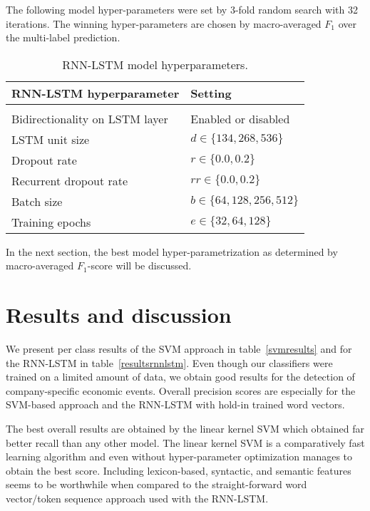 \documentclass[11pt,a4paper]{article}
\begin{document}
The following model hyper-parameters were set by 3-fold random search with 32 iterations. The winning hyper-parameters are chosen by macro-averaged $F_1$ over the multi-label prediction.
\begin{table}[h!]
	\centering
	\small{
		\begin{tabular}{ll}
			\textbf{RNN-LSTM hyperparameter} & \textbf{Setting}            \\   
			\hline \\
			Bidirectionality on LSTM layer         & Enabled or disabled         \\
			LSTM unit size                         & $d\in\{134, 268, 536\}$     \\
			Dropout rate                           & $r\in\{0.0, 0.2\}$          \\
			Recurrent dropout rate                 & $rr\in\{0.0, 0.2\}$         \\
			Batch size                             & $b\in\{64, 128, 256, 512\}$ \\
			Training epochs                        & $e\in\{32, 64, 128\}$       \\
		\end{tabular}
		\caption{RNN-LSTM model hyperparameters.}
		\label{tab:classifparam}
	}
\end{table}

\noindent In the next section, the best model hyper-parametrization as determined by macro-averaged $F_1$-score will be discussed.

\section{Results and discussion}
We present per class results of the SVM approach in table~\ref{svmresults} and for the RNN-LSTM in table~\ref{resultsrnnlstm}.
Even though our classifiers were trained on a limited amount of data, we obtain good results for the detection of company-specific economic events.
Overall precision scores are especially for the SVM-based approach and the RNN-LSTM with hold-in trained word vectors.

The best overall results are obtained by the linear kernel SVM which obtained far better recall than any other model.
The linear kernel SVM is a comparatively fast learning algorithm and even without hyper-parameter optimization manages to obtain the best score.
Including lexicon-based, syntactic, and semantic features seems to be worthwhile when compared to the straight-forward word vector/token sequence approach used with the RNN-LSTM.
\end{document}
